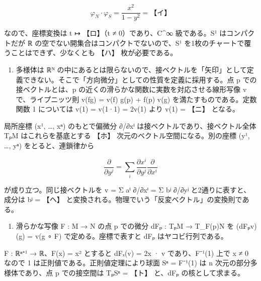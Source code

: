 \documentclass[
  10pt,
  a4paper,
]{article}
\providecommand{\tightlist}{%
  \setlength{\itemsep}{0pt}\setlength{\parskip}{0pt}}
\begin{document}
\[\varphi_N \cdot \varphi_S = \frac{x^2}{1 - y^2} = \text{【イ】}\]

なので、座標変換は t {\fallbackfont ↦} 【ロ】（t ≠ 0）であり、C\^{}∞
級である。S¹ はコンパクトだが {\fallbackfont ℝ}
の空でない開集合はコンパクトでないので、S¹
を1枚のチャートで覆うことはできず、少なくとも 【ハ】 枚が必要である。

\begin{enumerate}
\def\labelenumi{(\arabic{enumi})}
\setcounter{enumi}{1}
\tightlist
\item
  多様体は {\fallbackfont ℝᴺ}
  の中にあるとは限らないので、接ベクトルを「矢印」として定義できない。そこで「方向微分」としての性質を定義に採用する。点
  p での接ベクトルとは、p の近くの滑らかな関数に実数を対応させる線形写像
  v で、ライプニッツ則 v(fg) = v(f) g(p) + f(p) v(g)
  を満たすものである。定数関数 1 については v(1) = v(1·1) = 2v(1) より
  v(1) = 【ニ】 となる。
\end{enumerate}

局所座標 (x¹, \ldots, x{\fallbackfont ⁿ}) のもとで偏微分
∂/∂x{\fallbackfont ⁱ}
は接ベクトルであり、接ベクトル全体 T{\fallbackfont ₚ}M
はこれらを基底とする 【ホ】 次元のベクトル空間になる。別の座標 (y¹,
\ldots, y{\fallbackfont ⁿ}) をとると、連鎖律から

\[\frac{\partial}{\partial y^j} = \sum_i \frac{\partial x^i}{\partial y^j} \frac{\partial}{\partial x^i}\]

が成り立つ。同じ接ベクトルを v = Σ a{\fallbackfont ⁱ}
∂/∂x{\fallbackfont ⁱ} = Σ b{\fallbackfont ʲ} ∂/∂y{\fallbackfont ʲ}
と2通りに表すと、成分は b{\fallbackfont ʲ} = 【ヘ】
と変換される。物理でいう「反変ベクトル」の変換則である。

\begin{enumerate}
\def\labelenumi{(\arabic{enumi})}
\setcounter{enumi}{2}
\tightlist
\item
  滑らかな写像 F : M → N の点 p での微分 dF{\fallbackfont ₚ} :
  T{\fallbackfont ₚ}M → T\_F(p)N を (dF{\fallbackfont ₚ}v)(g) = v(g
  {\fallbackfont ∘} F) で定める。座標で表すと dF{\fallbackfont ₚ}
  はヤコビ行列である。
\end{enumerate}

F : {\fallbackfont ℝⁿ⁺}¹ → {\fallbackfont ℝ}、F(x) = \textbar x\textbar²
とすると dF{\fallbackfont ₓ}(v) = 2x · v であり、F{\fallbackfont ⁻}¹(1)
上で x ≠ 0 なので 1 は正則値である。正則値定理により球面
S{\fallbackfont ⁿ} = F{\fallbackfont ⁻}¹(1) は n
次元の部分多様体であり、点 p での接空間は
T{\fallbackfont ₚ}S{\fallbackfont ⁿ} = 【ト】 と、dF{\fallbackfont ₚ}
の核として求まる。
\end{document}
